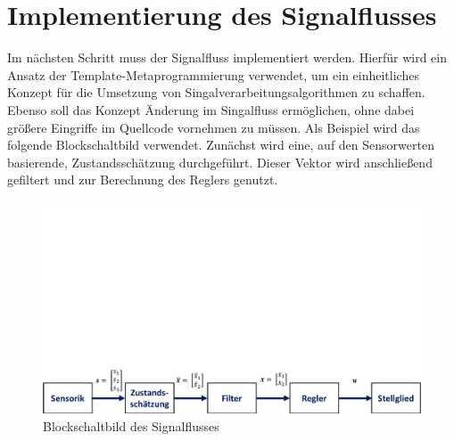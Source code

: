 \section{Implementierung des Signalflusses}
Im nächsten Schritt muss der Signalfluss implementiert werden. Hierfür wird ein Ansatz der Template-Metaprogrammierung verwendet, um ein einheitliches Konzept für die Umsetzung von Singalverarbeitungsalgorithmen zu schaffen. Ebenso soll das Konzept Änderung im Singalfluss ermöglichen, ohne dabei größere Eingriffe im Quellcode vornehmen zu müssen. Als Beispiel wird das folgende Blockschaltbild verwendet.
Zunächst wird eine, auf den Sensorwerten basierende, Zustandsschätzung durchgeführt. Dieser Vektor wird anschließend gefiltert und zur Berechnung des Reglers genutzt.
\begin{figure}[!h]
\centering
\includegraphics[width=0.9\linewidth, trim={0cm 0cm 0cm 14cm}, clip]{img/SW_1_Signalfluss_BSB.pdf}
\caption{Blockschaltbild des Signalflusses}
\end{figure}

